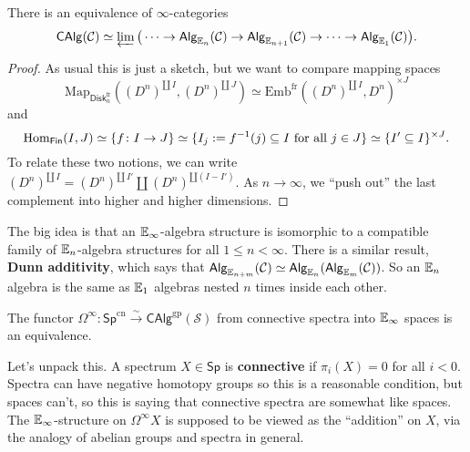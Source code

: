    \begin{prop}\label{calgeq} 
       There is an equivalence of $\infty$-categories \[
           \mathsf{CAlg} (\mathcal{C} )\simeq \varprojlim \big( \cdots \to \mathsf{Alg} _{\mathbb{E}_n }(\mathcal{C} ) \to \mathsf{Alg} _{\mathbb{E}_{n+1}}(\mathcal{C} ) \to  \cdots  \to  \mathsf{Alg} _{\mathbb{E}_1}(\mathcal{C} )\big).
       \] 
   \end{prop}
   \begin{proof}
       As usual this is just a sketch, but we want to compare mapping spaces 
       \[
       \mathrm{Map}_{\mathsf{Disk} _n ^{\mathrm{fr}}}((D^n )^{\amalg\, I},(D^n )^{\amalg \,J}) \simeq \mathrm{Emb}^{\mathrm{fr}}((D^n )^{\amalg \, I},D^n )^{\times J}
       \] and \[
       \operatorname{Hom} _{\mathsf{Fin} }(I,J) \simeq \{f \colon I \to J\} \simeq  \{I_j  := f^{-1}(j) \subseteq I\ \text{for all} \ j \in J\} \simeq \{I' \subseteq I\} ^{\times J}.
   \] To relate these two notions, we can write $(D^n )^{\amalg \, I}=(D^n )^{\amalg \, I'}\amalg (D^n )^{\amalg (I-I')}$. As $n \to \infty$, we ``push out'' the last complement into higher and higher dimensions.
   \end{proof}

   The big idea is that an $\mathbb{E} _{\infty}$-algebra structure is isomorphic to a compatible family of $\mathbb{E}_n $-algebra structures for all $1 \leq n < \infty$. There is a similar result, \textbf{Dunn additivity}, which says that $\mathsf{Alg} _{\mathbb{E}_{n+m}}(\mathcal{C} )\simeq \mathsf{Alg} _{\mathbb{E}_n }(\mathsf{Alg} _{\mathbb{E}_m}(\mathcal C))$. So an $\mathbb{E}_n $ algebra is the same as $\mathbb{E}_1$ algebras nested $n$ times inside each other.

   \begin{theorem}\label{mrp} 
       The functor $\Omega^{\infty} \colon \mathsf{Sp} ^{\mathrm{cn}} \xrightarrow{\sim} \mathsf{CAlg} ^{\mathrm{gp}}(\mathcal{S}) $ from connective spectra into $\mathbb{E}_{\infty}$ spaces is an equivalence.
   \end{theorem}
   Let's unpack this. A spectrum $X \in \mathsf{Sp} $ is \textbf{connective} if $\pi_i (X)=0$ for all $i<0$. Spectra can have negative homotopy groups so this is a reasonable condition, but spaces can't, so this is saying that connective spectra are somewhat like spaces. The $\mathbb{E}_{\infty}$-structure on $\Omega^{\infty}X$ is supposed to be viewed as the ``addition'' on $X$, via the analogy of abelian groups and spectra in general.

